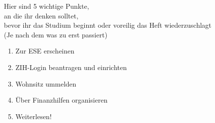 
\hspace*{4em}Hier sind 5 wichtige Punkte,\\
\hspace*{8em}an die ihr denken solltet,\\
\hspace*{12em}bevor ihr das Studium beginnt oder voreilig das Heft wiederzuschlagt\\
\hspace*{16em}(Je nach dem was zu erst passiert)\\[2em]

{
\LARGE
\hspace*{2cm}
\begin{enumerate}[label={\raisebox{.1cm}{\colorbox{gray!60}{\normalsize\textcolor{white}{\arabic*}}}}, itemsep=1cm, labelsep=.75cm, labelindent=.75cm, leftmargin=*]
  \item Zur ESE erscheinen
  \item ZIH-Login beantragen und einrichten
  \item Wohnsitz ummelden
  \item Über Finanzhilfen organisieren
  \item Weiterlesen!
\end{enumerate}
}
